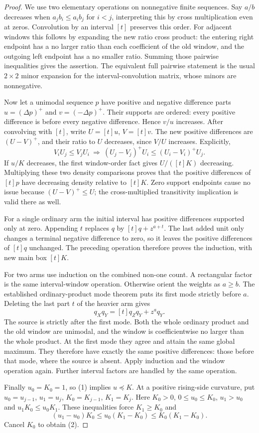 \begin{proof}
We use two elementary operations on nonnegative finite sequences.
Say $a/b$ decreases when $a_jb_i\le a_ib_j$ for $i<j$,
interpreting this by cross multiplication even at zeros.
Convolution by an interval $[t]$ preserves this order.
For adjacent windows this follows by expanding the new ratio
cross product: the entering right endpoint has a no larger
ratio than each coefficient of the old window, and the outgoing
left endpoint has a no smaller ratio. Summing those pairwise
inequalities gives the assertion. The equivalent full pairwise
statement is the usual $2\times2$ minor expansion for the
interval-convolution matrix, whose minors are nonnegative.

Now let a unimodal sequence $p$ have positive and negative
difference parts $u=(\Delta p)^+$ and $v=(-\Delta p)^+$.
Their supports are ordered: every positive difference is
before every negative difference. Hence $v/u$ increases.
After convolving with $[t]$, write $U=[t]u$, $V=[t]v$.
The new positive differences are $(U-V)^+$, and their ratio
to $U$ decreases, since $V/U$ increases. Explicitly,
\[
 V_iU_j\le V_jU_i
 \ \Longrightarrow\
       (U_j-V_j)^+U_i\le(U_i-V_i)^+U_j.
\]
If $u/K$ decreases, the first window-order fact gives
$U/([t]K)$ decreasing. Multiplying these two density
comparisons proves that the positive differences of $[t]p$
have decreasing density relative to $[t]K$.
Zero support endpoints cause no issue because
$(U-V)^+\le U$; the cross-multiplied transitivity implication
is valid there as well.

For a single ordinary arm the initial interval has positive
differences supported only at zero. Appending $t$ replaces
$q$ by $[t]q+z^{a+t}$. The last added unit only changes a
terminal negative difference to zero, so it leaves the positive
differences of $[t]q$ unchanged. The preceding operation
therefore proves the induction, with new main box $[t]K$.

For two arms use induction on the combined non-one count.
A rectangular factor is the same interval-window operation.
Otherwise orient the weights as $a\ge b$. The established
ordinary-product mode theorem puts its first mode strictly
before $a$. Deleting the last part $t$ of the heavier arm gives
\[
                     q_Xq_Y=[t]q_Zq_Y+z^a q_Y.
\]
The source is strictly after the first mode. Both the whole
ordinary product and the old window are unimodal, and the
window is coefficientwise no larger than the whole product.
At the first mode they agree and attain the same global
maximum. They therefore have exactly the same positive
differences: those before that mode, where the source is absent.
Apply induction and the window operation again.
Further interval factors are handled by the same operation.

Finally $u_0=K_0=1$, so (1) implies $u\preceq K$.
At a positive rising-side curvature, put
$u_0=u_{j-1}$, $u_1=u_j$, $K_0=K_{j-1}$, $K_1=K_j$.
Here $K_0>0$, $0\le u_0\le K_0$, $u_1>u_0$ and
$u_1K_0\le u_0K_1$. These inequalities force $K_1\ge K_0$
and
\[
 (u_1-u_0)K_0\le u_0(K_1-K_0)\le K_0(K_1-K_0).
\]
Cancel $K_0$ to obtain (2).
\end{proof}

